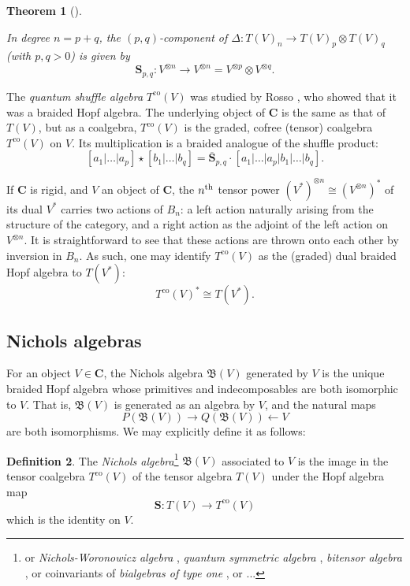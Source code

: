 \documentclass[12pt]{article}
\DeclareMathOperator{\co}{co}
\newcommand{\bC} {\mathbf{C}}
\newcommand{\bS} {\mathbf{S}}
\newcommand{\mB}{\mathfrak{B}}
\newcommand{\beqn}{\begin{equation}}
\newcommand{\eeqn}{\end{equation}}
\newcommand{\nth}{\textsuperscript{th}}
\theoremstyle{plain}
\newtheorem{thm}{Theorem}[section]
\theoremstyle{definition}
\newtheorem{defn}[thm]{Definition}
\theoremstyle{remark}
\begin{document}
\begin{thm}[\cite{schauenburg}] \label{shauenburg_thm}

In degree $n=p+q$, the $(p, q)$-component of $\Delta: T(V)_n \to T(V)_p \otimes T(V)_q$ (with $p, q>0$) is given by 
%
$$\bS_{p, q}:V^{\otimes n} \to V^{\otimes n} = V^{\otimes p} \otimes V^{\otimes q}.$$

\end{thm}

The \emph{quantum shuffle algebra} $T^{\co}(V)$ was studied by Rosso \cite{rosso}, who showed that it was a braided Hopf algebra.  The underlying object of $\bC$ is the same as that of $T(V)$, but as a coalgebra, $T^{\co}(V)$ is the graded, cofree (tensor) coalgebra $T^{\co}(V)$ on $V$.  Its multiplication is a braided analogue of the shuffle product:
%
$$[a_1| \dots | a_p] \star [b_1 | \dots | b_q] = \overline{\bS}_{p, q} \cdot [a_1| \dots | a_p | b_1 | \dots | b_q].$$

If $\bC$ is rigid, and $V$ an object of $\bC$, the $n\nth$ tensor power $(V^*)^{\otimes n} \cong (V^{\otimes n})^*$ of its dual $V^*$ carries two actions of $B_n$: a left action naturally arising from the structure of the category, and a right action as the adjoint of the left action on $V^{\otimes n}$.  It is straightforward to see that these actions are thrown onto each other by inversion in $B_n$.  As such, one may identify $T^{\co}(V)$ as the (graded) dual braided Hopf algebra to $T(V^*)$:
%
$$T^{\co}(V)^* \cong T(V^*).$$

\subsection{Nichols algebras} \label{nichols_section} 

For an object $V \in \bC$, the Nichols algebra $\mB(V)$ generated by $V$ is the unique braided Hopf algebra whose primitives and indecomposables are both isomorphic to $V$.  That is, $\mB(V)$ is generated as an algebra by $V$, and the natural maps 
%
$$P(\mB(V)) \to Q(\mB(V)) \leftarrow V$$
%
are both isomorphisms.  We may explicitly define it as follows:

\begin{defn}

The \emph{Nichols algebra}\footnote{or \emph{Nichols-Woronowicz algebra} \cite{bazlov}, \emph{quantum symmetric algebra} \cite{rosso}, \emph{bitensor algebra} \cite{schauenburg}, or coinvariants of \emph{bialgebras of type one} \cite{nichols}, or ...} $\mB(V)$ associated to $V$ is the image in the tensor coalgebra $T^{\co}(V)$ of the tensor algebra $T(V)$ under the Hopf algebra map 
%
\beqn \bS: T(V) \to T^{\co}(V) \label{TV_eqn} \eeqn
%
which is the identity on $V$.  

\end{defn}
\end{document}

